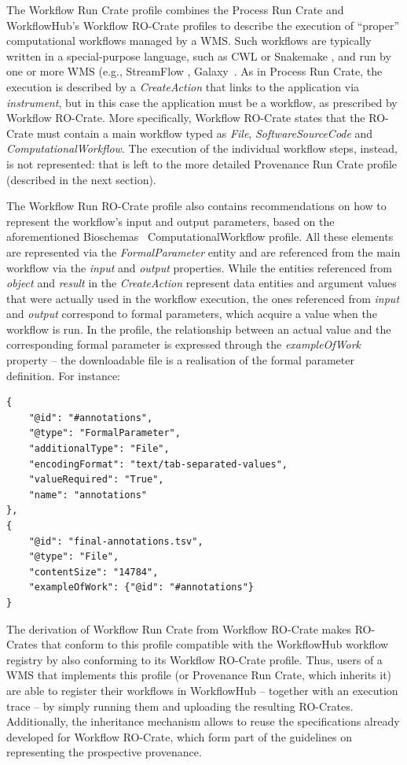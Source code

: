 \documentclass[10pt,letterpaper]{article}
\begin{document}
The Workflow Run Crate profile combines the Process Run Crate and WorkflowHub's Workflow RO-Crate \cite{Bacall 2022} profiles to describe the execution of “proper” computational workflows managed by a WMS.
Such workflows are typically written in a special-purpose language, such as CWL or Snakemake
\cite{Koster 2012}, and run by one or more WMS (e.g., StreamFlow
\cite{Colonnelli 2020}, Galaxy~\cite{Galaxy 2022}.
As in Process Run Crate, the execution is described by a \emph{CreateAction}
that links to the application via \emph{instrument}, but in this case the application must be a workflow, as prescribed by Workflow RO-Crate.
More specifically, Workflow RO-Crate states that the RO-Crate must contain a main workflow typed as \emph{File}, \emph{SoftwareSourceCode}
and \emph{ComputationalWorkflow}.
The execution of the individual workflow steps, instead, is not represented: that is left to the more detailed Provenance Run Crate profile (described in the next section).

The Workflow Run RO-Crate profile also contains recommendations on how to represent the workflow's input and output parameters, based on the aforementioned Bioschemas~\cite{Gray 2017} ComputationalWorkflow profile.
All these elements are represented via the \emph{FormalParameter} entity and are referenced from the main workflow via the \emph{input} and
\emph{output} properties.
While the entities referenced from
\emph{object} and \emph{result} in the \emph{CreateAction} represent data entities and argument values that were actually used in the workflow execution, the ones referenced from \emph{input} and
\emph{output} correspond to formal parameters, which acquire a value when the workflow is run.
In the profile, the relationship between an actual value and the corresponding formal parameter is expressed through the \emph{exampleOfWork} property -- the downloadable file is a realisation of the formal parameter definition.
For instance:

\begin{verbatim}
{
    "@id": "#annotations",
    "@type": "FormalParameter",
    "additionalType": "File",
    "encodingFormat": "text/tab-separated-values",
    "valueRequired": "True",
    "name": "annotations"
},
{
    "@id": "final-annotations.tsv",
    "@type": "File",
    "contentSize": "14784",
    "exampleOfWork": {"@id": "#annotations"}
}
\end{verbatim}

The derivation of Workflow Run Crate from Workflow RO-Crate makes RO-Crates that conform to this profile compatible with the WorkflowHub workflow registry by also conforming to its Workflow RO-Crate profile.
Thus, users of a WMS that implements this profile (or Provenance Run Crate, which inherits it) are able to register their workflows in WorkflowHub -- together with an execution trace -- by simply running them and uploading the resulting RO-Crates.
Additionally, the inheritance mechanism allows to reuse the specifications already developed for Workflow RO-Crate, which form part of the guidelines on representing the prospective provenance.
\end{document}
